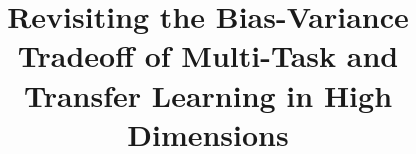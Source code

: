 \documentclass{article}
\begin{document}
\title{Revisiting the Bias-Variance Tradeoff of Multi-Task and Transfer Learning in High Dimensions}
\maketitle











\newpage
\appendix





\end{document}
